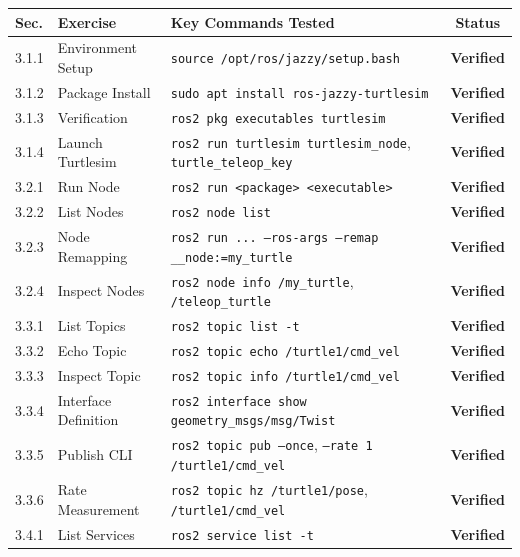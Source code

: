 \documentclass[11pt,a4paper]{article}
\begin{document}
\begin{center}
\footnotesize
\begin{tabular}{ll>{\raggedright\arraybackslash}p{8.5cm}c}
\toprule
\textbf{Sec.} & \textbf{Exercise} & \textbf{Key Commands Tested} & \textbf{Status} \\
\midrule
3.1.1 & Environment Setup & \texttt{source /opt/ros/jazzy/setup.bash} & \textcolor{primary}{\textbf{Verified}} \\
3.1.2 & Package Install & \texttt{sudo apt install ros-jazzy-turtlesim} & \textcolor{primary}{\textbf{Verified}} \\
3.1.3 & Verification & \texttt{ros2 pkg executables turtlesim} & \textcolor{primary}{\textbf{Verified}} \\
3.1.4 & Launch Turtlesim & \texttt{ros2 run turtlesim turtlesim\_node}, \texttt{turtle\_teleop\_key} & \textcolor{primary}{\textbf{Verified}} \\
\midrule
3.2.1 & Run Node & \texttt{ros2 run <package> <executable>} & \textcolor{primary}{\textbf{Verified}} \\
3.2.2 & List Nodes & \texttt{ros2 node list} & \textcolor{primary}{\textbf{Verified}} \\
3.2.3 & Node Remapping & \texttt{ros2 run ... --ros-args --remap \_\_node:=my\_turtle} & \textcolor{primary}{\textbf{Verified}} \\
3.2.4 & Inspect Nodes & \texttt{ros2 node info /my\_turtle}, \texttt{/teleop\_turtle} & \textcolor{primary}{\textbf{Verified}} \\
\midrule
3.3.1 & List Topics & \texttt{ros2 topic list -t} & \textcolor{primary}{\textbf{Verified}} \\
3.3.2 & Echo Topic & \texttt{ros2 topic echo /turtle1/cmd\_vel} & \textcolor{primary}{\textbf{Verified}} \\
3.3.3 & Inspect Topic & \texttt{ros2 topic info /turtle1/cmd\_vel} & \textcolor{primary}{\textbf{Verified}} \\
3.3.4 & Interface Definition & \texttt{ros2 interface show geometry\_msgs/msg/Twist} & \textcolor{primary}{\textbf{Verified}} \\
3.3.5 & Publish CLI & \texttt{ros2 topic pub --once}, \texttt{--rate 1 /turtle1/cmd\_vel} & \textcolor{primary}{\textbf{Verified}} \\
3.3.6 & Rate Measurement & \texttt{ros2 topic hz /turtle1/pose}, \texttt{/turtle1/cmd\_vel} & \textcolor{primary}{\textbf{Verified}} \\
\midrule
3.4.1 & List Services & \texttt{ros2 service list -t} & \textcolor{primary}{\textbf{Verified}} \\

\end{tabular}
\end{center}
\end{document}
